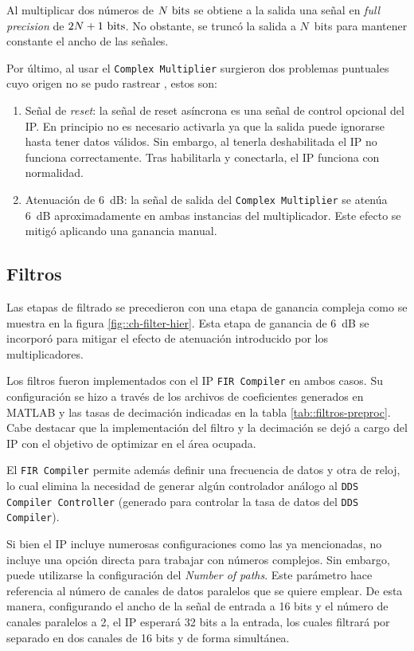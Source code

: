 \documentclass[../../main.tex]{subfiles}
\begin{document}
Al multiplicar dos números de $N~\textrm{bits}$ se obtiene a la salida una señal en \textit{full precision} de $2 N + 1~\textrm{bits}$. No obstante, se truncó la salida a $N$~bits para mantener constante el ancho de las señales.

Por último, al usar el \texttt{Complex Multiplier} surgieron dos problemas puntuales cuyo origen no se pudo rastrear , estos son:
\begin{enumerate}
    \item Señal de \textit{reset}: la señal de reset asíncrona es una señal de control opcional del IP. En principio no es necesario activarla ya que la salida puede ignorarse hasta tener datos válidos. Sin embargo, al tenerla deshabilitada el IP no funciona correctamente. Tras habilitarla y conectarla, el IP funciona con normalidad.
    \item Atenuación de 6~dB: la señal de salida del \texttt{Complex Multiplier} se atenúa 6~dB aproximadamente en ambas instancias del multiplicador. Este efecto se mitigó aplicando una ganancia manual.
\end{enumerate}

\subsection{Filtros}
Las etapas de filtrado se precedieron con una etapa de ganancia compleja como se muestra en la figura \ref{fig::ch-filter-hier}. Esta etapa de ganancia de 6~dB se incorporó para mitigar el efecto de atenuación introducido por los multiplicadores.

Los filtros fueron implementados con el IP \texttt{FIR Compiler} en ambos casos. Su configuración se hizo a través de los archivos de coeficientes generados en MATLAB y las tasas de decimación indicadas en la tabla \ref{tab::filtros-preproc}. Cabe destacar que la implementación del filtro y la decimación se dejó a cargo del IP con el objetivo de optimizar en el área ocupada.

El \texttt{FIR Compiler} permite además definir una frecuencia de datos y otra de reloj, lo cual elimina la necesidad de generar algún controlador análogo al \texttt{DDS Compiler Controller} (generado para controlar la tasa de datos del \texttt{DDS Compiler}).

Si bien el IP incluye numerosas configuraciones como las ya mencionadas, no incluye una opción directa para trabajar con números complejos. Sin embargo, puede utilizarse la configuración del \textit{Number of paths}. Este parámetro hace referencia al número de canales de datos paralelos que se quiere emplear. De esta manera, configurando el ancho de la señal de entrada a 16 bits y el número de canales paralelos a 2, el IP esperará 32 bits a la entrada, los cuales filtrará por separado en dos canales de 16 bits y de forma simultánea.
\end{document}
